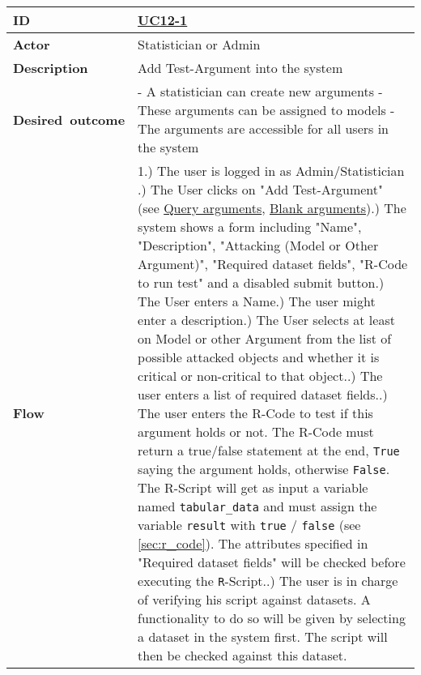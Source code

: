 
{ \tiny
	\begin{longtable}{|p{2cm} p{11cm}|}

		\hline
			\textbf{ID} & 
				\href{https://trello.com/c/2V6Cl65u}{UC12-1}\\
			
			\hline
			\textbf{Actor} & Statistician or Admin \\
			\hline
			\textbf{Description} & 
				Add Test-Argument into the system\\
			\hline
			\textbf{Desired~outcome} & 
				- A statistician can create new arguments \newline
				- These arguments can be assigned to models \newline
				- The arguments are accessible for all users in the system \newline
		\\
		\hline
			\textbf{Flow} & 
				1.) The user is logged in as Admin/Statistician  \newline
				2.) The User clicks on "Add Test-Argument" (see \href{https://trello.com/c/OwM2Z7wt}{Query arguments}, \href{https://trello.com/c/Rg6GPnNE/39-uc12-5-add-attacks-between-arguments}{Blank arguments})\newline
				3.) The system shows a form including "Name", "Description", "Attacking (Model or Other Argument)", "Required dataset fields", "R-Code to run test" and a disabled submit button\newline
				4.) The User enters a Name\newline
				5.) The user might enter a description\newline
				6.) The User selects at least on Model or other Argument from the list of possible attacked objects and whether it is critical or non-critical to that object.\newline
				7.) The user enters a list of required dataset fields.\newline
				8.) The user enters the R-Code to test if this argument holds or not. The R-Code must return a true/false statement at the end, \texttt{True} saying the argument holds, otherwise \texttt{False}. The R-Script will get as input a variable named \texttt{tabular\_data}  and must assign the variable \texttt{result} with \texttt{true} / \texttt{false} (see \autoref{sec:r_code}). The attributes specified in "Required dataset fields" will be checked before executing the \texttt{R}-Script.\newline
				9.) The user is in charge of verifying his script against datasets. A functionality to do so will be given by selecting a dataset in the system first. The script will then be checked against this dataset.\newline

\end{longtable}}
